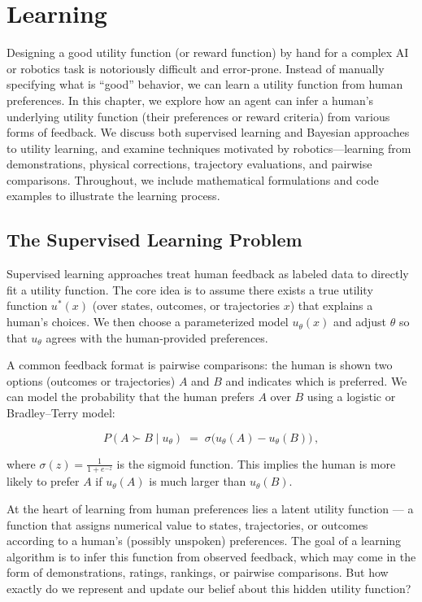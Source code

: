 \documentclass[
  letterpaper,
  numbers=noenddot,
  DIV=11]{scrreprt}
\let\oldchapter\chapter
\def\chapter{%
  \setcounter{sidenote}{1}%
  \oldchapter
}
\theoremstyle{plain}
\theoremstyle{definition}
\theoremstyle{remark}
\begin{document}

\chapter{Learning}\label{learning}

Designing a good utility function (or reward function) by hand for a
complex AI or robotics task is notoriously difficult and error-prone.
Instead of manually specifying what is ``good'' behavior, we can learn a
utility function from human preferences. In this chapter, we explore how
an agent can infer a human's underlying utility function (their
preferences or reward criteria) from various forms of feedback. We
discuss both supervised learning and Bayesian approaches to utility
learning, and examine techniques motivated by robotics---learning from
demonstrations, physical corrections, trajectory evaluations, and
pairwise comparisons. Throughout, we include mathematical formulations
and code examples to illustrate the learning process.

\section{The Supervised Learning
Problem}\label{the-supervised-learning-problem}

Supervised learning approaches treat human feedback as labeled data to
directly fit a utility function. The core idea is to assume there exists
a true utility function \(u^*(x)\) (over states, outcomes, or
trajectories \(x\)) that explains a human's choices. We then choose a
parameterized model \(u_\theta(x)\) and adjust \(\theta\) so that
\(u_\theta\) agrees with the human-provided preferences.

A common feedback format is pairwise comparisons: the human is shown two
options (outcomes or trajectories) \(A\) and \(B\) and indicates which
is preferred. We can model the probability that the human prefers \(A\)
over \(B\) using a logistic or Bradley--Terry model:

\[
P(A \succ B \mid u_\theta) \;=\; \sigma\!\Big(u_\theta(A) - u_\theta(B)\Big)\,,
\]

where \(\sigma(z)=\frac{1}{1+e^{-z}}\) is the sigmoid function. This
implies the human is more likely to prefer \(A\) if \(u_\theta(A)\) is
much larger than \(u_\theta(B)\).

At the heart of learning from human preferences lies a latent utility
function --- a function that assigns numerical value to states,
trajectories, or outcomes according to a human's (possibly unspoken)
preferences. The goal of a learning algorithm is to infer this function
from observed feedback, which may come in the form of demonstrations,
ratings, rankings, or pairwise comparisons. But how exactly do we
represent and update our belief about this hidden utility function?
\end{document}
